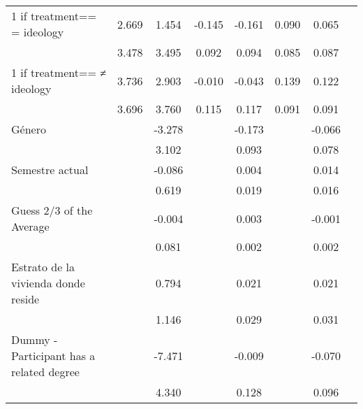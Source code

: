 \begin{table}[H]
{\begin{threeparttable}
\begin{tabular}{lccccccc}
\midrule
1 if treatment== = ideology&       2.669         &       1.454         &      -0.145         &      -0.161\sym{*}  &       0.090         &       0.065         \\
                    &       3.478         &       3.495         &       0.092         &       0.094         &       0.085         &       0.087         \\
1 if treatment== ≠ ideology&       3.736         &       2.903         &      -0.010         &      -0.043         &       0.139         &       0.122         \\
                    &       3.696         &       3.760         &       0.115         &       0.117         &       0.091         &       0.091         \\
Género             &                     &      -3.278         &                     &      -0.173\sym{*}  &                     &      -0.066         \\
                    &                     &       3.102         &                     &       0.093         &                     &       0.078         \\
Semestre actual     &                     &      -0.086         &                     &       0.004         &                     &       0.014         \\
                    &                     &       0.619         &                     &       0.019         &                     &       0.016         \\
Guess 2/3 of the Average&                     &      -0.004         &                     &       0.003         &                     &      -0.001         \\
                    &                     &       0.081         &                     &       0.002         &                     &       0.002         \\
Estrato de la vivienda donde reside&                     &       0.794         &                     &       0.021         &                     &       0.021         \\
                    &                     &       1.146         &                     &       0.029         &                     &       0.031         \\
Dummy - Participant has a related degree&                     &      -7.471\sym{*}  &                     &      -0.009         &                     &      -0.070         \\
                    &                     &       4.340         &                     &       0.128         &                     &       0.096         \\

\end{tabular}
\end{threeparttable}}
\end{table}
